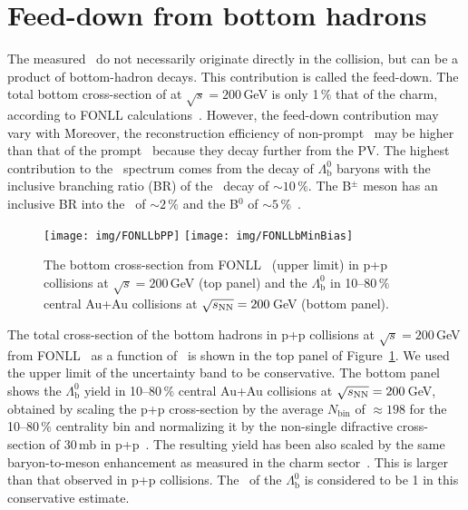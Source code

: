 \section{Feed-down from bottom hadrons}
The measured \Lambdac\ do not necessarily originate directly in the collision, but can be a product of bottom-hadron decays. This contribution is called the feed-down. The total bottom cross-section of at $\sqrt{s} = 200\,$GeV is only 1$\,\%$ that of the charm, according to FONLL calculations~\cite{FONLLcharm}\@. However, the feed-down contribution may vary with \pt\. Moreover, the reconstruction efficiency of non-prompt \Lambdac\ may be higher than that of the prompt \Lambdac\ because they decay further from the PV\@. The highest contribution to the \Lambdacpm\ spectrum comes from the decay of $\Lambda_\mathrm{b}^0$ baryons with the inclusive branching ratio (BR) of the \Lambdacpm\ decay of $\sim10\,\%$\@. The B$^\pm$ meson has an inclusive BR into the \Lambdacpm\ of $\sim 2\,\%$ and the B$^0$ of $\sim5\,\%$~\cite{PDG}\@.

\begin{figure}[!htb]
\centering
\texttt{[image: img/FONLLbPP]}
\texttt{[image: img/FONLLbMinBias]}
\caption[The bottom cross-section from FONLL (upper limit) in p+p collisions and the $\Lambda_\mathrm{b}^0$ in  Au+Au collisions.]{\label{FONLLb} The bottom cross-section from FONLL~\cite{FONLLcharm} (upper limit) in p+p collisions at $\sqrt{s} = 200\,$GeV (top panel) and the $\Lambda_\mathrm{b}^0$ in 10--80$\,\%$ central Au+Au collisions at $\sqrt{s_\text{NN}} = 200\,$GeV (bottom panel)\@.}
\end{figure}


The total cross-section of the bottom hadrons in p+p collisions at $\sqrt{s} = 200\,$GeV from FONLL~\cite{FONLLcharm} as a function of \pt\ is shown in the top panel of Figure~\ref{FONLLb}\@. We used the upper limit of the uncertainty band to be conservative. The bottom panel shows the $\Lambda_\mathrm{b}^0$ yield in 10--80$\,\%$ central Au+Au collisions at $\sqrt{s_\text{NN}} = 200\,$GeV, obtained by scaling the p+p cross-section by the average $N_\mathrm{bin}$ of $\approx 198$ for the 10--80$\,\%$ centrality bin and normalizing it by the non-single difractive cross-section of 30$\,$mb in p+p~\cite{ppCrossSection}\@. The resulting yield has been also scaled by the same baryon-to-meson enhancement as measured in the charm sector~\cite{baryonToMesonEnhancementSequentially}\@. This is larger than that observed in p+p collisions. The \Raa\ of the $\Lambda_\mathrm{b}^0$ is considered to be 1 in this conservative estimate.

